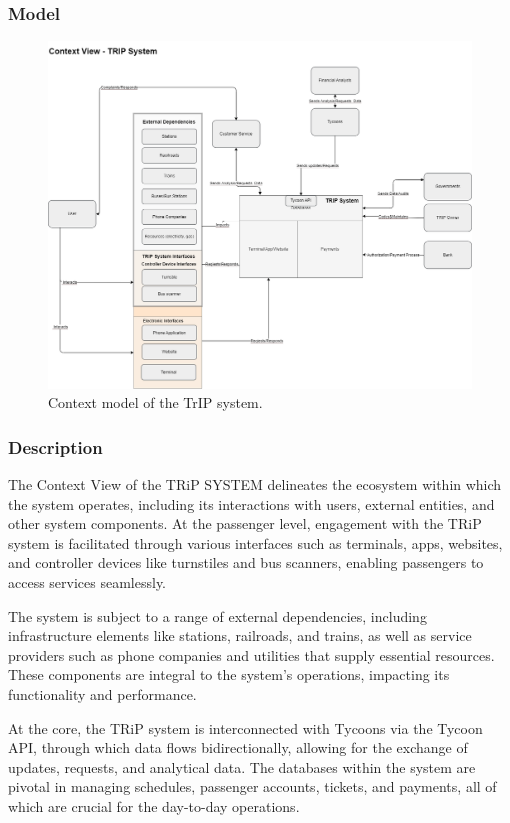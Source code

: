 \subsubsection{Model}
\begin{figure}[H]
    \centering
    \includegraphics[width=\textwidth]{drawings/views_final_version/context_view.png}
    \caption{Context model of the TrIP system.}
    \label{fig:context_view_model}
\end{figure}

\subsubsection{Description}
The Context View of the TRiP SYSTEM delineates the ecosystem within which the system operates, including its interactions with users, external entities, and other system components. At the passenger level, engagement with the TRiP system is facilitated through various interfaces such as terminals, apps, websites, and controller devices like turnstiles and bus scanners, enabling passengers to access services seamlessly.

The system is subject to a range of external dependencies, including infrastructure elements like stations, railroads, and trains, as well as service providers such as phone companies and utilities that supply essential resources. These components are integral to the system's operations, impacting its functionality and performance.

At the core, the TRiP system is interconnected with Tycoons via the Tycoon API, through which data flows bidirectionally, allowing for the exchange of updates, requests, and analytical data. The databases within the system are pivotal in managing schedules, passenger accounts, tickets, and payments, all of which are crucial for the day-to-day operations.

